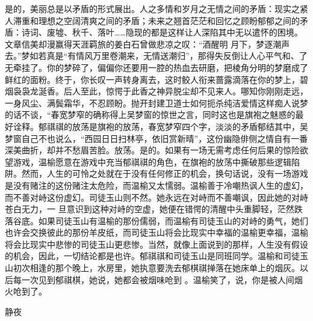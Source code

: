 \documentclass{article}
\begin{document}
是的，美丽总是以矛盾的形式展出。人之多情和岁月之无情之间的矛盾：现实之紧人滞重和理想之空阔清爽之间的矛盾；未来之翘首茫茫和回忆之顾盼郁郁之间的矛盾：诗词、废墟、秋千、落叶……隐现的都是这样让人深陷其中无以遣怀的困境。文章信美却漫赢得天涯羁旅的姜白石曾做悲凉之叹：“酒醒明
\newpage
月下，梦逐潮声去。”梦如若真是“有情风万里卷潮来，无情送潮归”，那得失反倒让人心平气和、了无牵挂了。你的梦碎了，偏偏你还要用一腔的热血去研磨，把棱角分明的梦磨成了鲜红的面粉。终于，你长叹一声转身离去，这时鲛人衔来蔷露滴落在你的梦上，碧烟袅袅龙涎香。后人至此，惊愕于此香之神异脱尘却不见来人。哪知你刚刚走远，一身风尘、满鬓霜华，不忍顾盼。抛开封建卫道士如何扼杀纯洁爱情这样痴人说梦的话不谈，“春宽梦窄的确称得上吴梦窗的惊世之言，同时这也是旗袍之魅惑的最好诠释。郁祺祺的放荡是旗袍的放荡，春宽梦窄四个字，淡淡的矛盾郁结其中，吴梦窗自己不也说么，“西园日日扫林亭，依旧赏新晴”，这份幽隐俳侧之情自有一番深美曲折，却并不愁眉苦脸。放荡。是的。如果有一场无需考虑任何后果的惊险欲望游戏，温榆愿意在游戏中充当郁祺祺的角色，在旗袍的放荡中撕破那些逻辑陷阱。然而，人生的可怜之处就在于没有任何修正的机会，换句话说，没有一场游戏是没有赌注的这份赌注太危险，而温榆又太懦弱。温榆善于冷嘲热讽人生的虚幻，而不善对峙这份虚幻。司徒玉山则不然。她永远在对峙而不善嘲讽，因此她的对峙苍白无力，一
\newpage
旦意识到这种对峙的空虚，她便在错愕的清醒中头重脚轻，茫然跌落谷底。如果司徒玉山有温榆的那份儒弱，而温榆有司徒玉山的对峙的勇气，她们也许会交换彼此的那份羊皮纸，而司徒玉山将会比现实中幸福的温榆更幸福，温榆将会比现实中悲惨的司徒玉山更悲惨。当然，就像上面说到的那样，人生没有假设的机会，因此，一切结论都是也许。郁祺祺和司徒玉山是同班同学。温榆和司徒玉山初次相逢的那个晚上，水房里，她执意要洗去郁棋祺掸落在她床单上的烟灰。以后每一次见到郁祺棋，她说，她都会被烟味呛到
。温榆笑了，说，你是被人间烟火呛到了。 


静夜 
\end{document}
